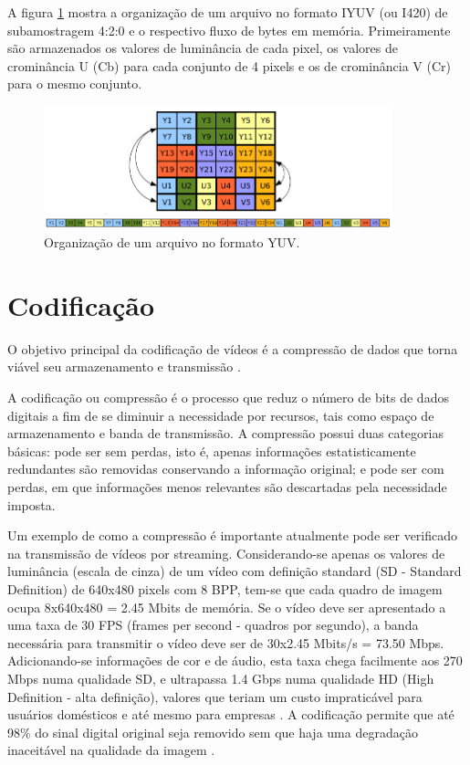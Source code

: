 A figura \ref{fig:yuvorganization} mostra a organização de um arquivo no formato IYUV (ou I420) de subamostragem 4:2:0 e o respectivo fluxo de bytes em memória. Primeiramente são armazenados os valores de luminância de cada pixel, os valores de crominância U (Cb) para cada conjunto de 4 pixels e os de crominância V (Cr) para o mesmo conjunto.

\begin{figure}[!htb]
	\centering
	\includegraphics[width=0.9\textwidth]{./imgs/yuvorganization.png}
	\caption{Organização de um arquivo no formato YUV.}
	\label{fig:yuvorganization}
\end{figure}

\section{Codificação}

O objetivo principal da codificação de vídeos é a compressão de dados que torna viável seu armazenamento e transmissão \cite{daronco}.

A codificação ou compressão é o processo que reduz o número de bits de dados digitais a fim de se diminuir a necessidade por recursos, tais como espaço de armazenamento e banda de transmissão. A compressão possui duas categorias básicas: pode ser sem perdas, isto é, apenas informações estatisticamente redundantes são removidas conservando a informação original; e pode ser com perdas, em que informações menos relevantes são descartadas pela necessidade imposta.

Um exemplo de como a compressão é importante atualmente pode ser verificado na transmissão de vídeos por streaming. Considerando-se apenas os valores de luminância (escala de cinza) de um vídeo com definição standard (SD - Standard Definition) de 640x480 pixels com 8 BPP, tem-se que cada quadro de imagem ocupa 8x640x480 = 2.45 Mbits de memória. Se o vídeo deve ser apresentado a uma taxa de 30 FPS (frames per second - quadros por segundo), a banda necessária para transmitir o vídeo deve ser de 30x2.45 Mbits/s = 73.50 Mbps. Adicionando-se informações de cor e de áudio, esta taxa chega facilmente aos 270 Mbps numa qualidade SD, e ultrapassa 1.4 Gbps numa qualidade HD (High Definition - alta definição), valores que teriam um custo impraticável para usuários domésticos e até mesmo para empresas \cite{ciscoieee}. A codificação permite que até 98\% do sinal digital original seja removido sem que haja uma degradação inaceitável na qualidade da imagem \cite{mpeg2ref}.

